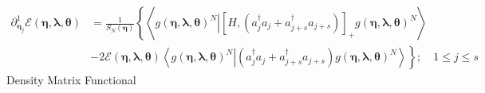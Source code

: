 \documentclass[aps,preprint]{revtex4}%
\begin{document}
\begin{align}
\partial_{\mathbf{\eta}_{j}}^{1}\mathcal{E}\left(  \mathbf{\eta}%
,\mathbf{\lambda},\mathbf{\theta}\right)   &  =\frac{1}{S_{N}\left(
\mathbf{\eta}\right)  }\left\{  \left\langle \left.  g\left(  \mathbf{\eta
},\mathbf{\lambda},\mathbf{\theta}\right)  ^{N}\right\vert \left[  H,\left(
a_{j}^{\dagger}a_{j}+a_{j+s}^{\dagger}a_{j+s}\right)  \right]  _{+}g\left(
\mathbf{\eta},\mathbf{\lambda},\mathbf{\theta}\right)  ^{N}\right\rangle
\right.  \nonumber\\
&  \left.  -2\mathcal{E}\left(  \mathbf{\eta},\mathbf{\lambda},\mathbf{\theta
}\right)  \left\langle \left.  g\left(  \mathbf{\eta},\mathbf{\lambda
},\mathbf{\theta}\right)  ^{N}\right\vert \left(  a_{j}^{\dagger}a_{j}%
+a_{j+s}^{\dagger}a_{j+s}\right)  g\left(  \mathbf{\eta},\mathbf{\lambda
},\mathbf{\theta}\right)  ^{N}\right\rangle \right\}  ;\quad1\leq j\leq
s\label{Deta}%
\end{align}
Density Matrix Functional\label{DMF}
\end{document}
